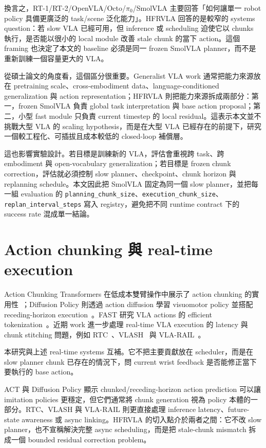 \documentclass[12pt,a4paper,oneside]{report}
\newcommand{\smolvla}{SmolVLA}
\begin{document}
換言之，RT-1/RT-2/OpenVLA/Octo/$\pi_0$/\smolvla{} 主要回答「如何讓單一 robot policy 具備更廣泛的 task/scene 泛化能力」。HFRVLA 回答的是較窄的 systems question：若 slow VLA 已經可用，但 inference 或 scheduling 迫使它以 chunks 執行，是否能以很小的 local module 改善 stale chunk 的當下 action。這個 framing 也決定了本文的 baseline 必須是同一 frozen \smolvla{} planner，而不是重新訓練一個容量更大的 VLA。

從碩士論文的角度看，這個區分很重要。Generalist VLA work 通常把能力來源放在 pretraining scale、cross-embodiment data、language-conditioned generalization 與 action representation；HFRVLA 則把能力來源拆成兩部分：第一，frozen \smolvla{} 負責 global task interpretation 與 base action proposal；第二，小型 fast module 只負責 current timestep 的 local residual。這表示本文並不挑戰大型 VLA 的 scaling hypothesis，而是在大型 VLA 已經存在的前提下，研究一個較工程化、可插拔且成本較低的 closed-loop 補償層。

這也影響實驗設計。若目標是訓練新的 VLA，評估會重視跨 task、跨 embodiment 與 open-vocabulary generalization；若目標是 frozen chunk correction，評估就必須控制 slow planner、checkpoint、chunk horizon 與 replanning schedule。本文因此把 \smolvla{} 固定為同一個 slow planner，並把每一組 evaluation 的 \texttt{planning\_chunk\_size}、\texttt{execution\_chunk\_size}、\texttt{replan\_interval\_steps} 寫入 registry，避免把不同 runtime contract 下的 success rate 混成單一結論。

\section{Action chunking 與 real-time execution}

Action Chunking Transformers 在低成本雙臂操作中展示了 action chunking 的實用性~\citep{zhao2023aloha}；Diffusion Policy 則透過 action diffusion 學習 visuomotor policy 並搭配 receding-horizon execution~\citep{chi2023diffusionpolicy}。FAST 研究 VLA actions 的 efficient tokenization~\citep{pertsch2025fast}。近期 work 進一步處理 real-time VLA execution 的 latency 與 chunk stitching 問題，例如 RTC~\citep{black2025rtc}、VLASH~\citep{tang2025vlash} 與 VLA-RAIL~\citep{zhao2025vlarail}。

本研究與上述 real-time systems 互補。它不把主要貢獻放在 scheduler，而是在 slow planner chunk 已存在的情況下，問 current wrist feedback 是否能修正當下要執行的 base action。

ACT 與 Diffusion Policy 顯示 chunked/receding-horizon action prediction 可以讓 imitation policies 更穩定，但它們通常將 chunk generation 視為 policy 本體的一部分。RTC、VLASH 與 VLA-RAIL 則更直接處理 inference latency、future-state awareness 或 async linking。HFRVLA 的切入點介於兩者之間：它不改 slow planner，也不宣稱解決完整 async scheduling，而是把 stale-chunk mismatch 拆成一個 bounded residual correction problem。
\end{document}
